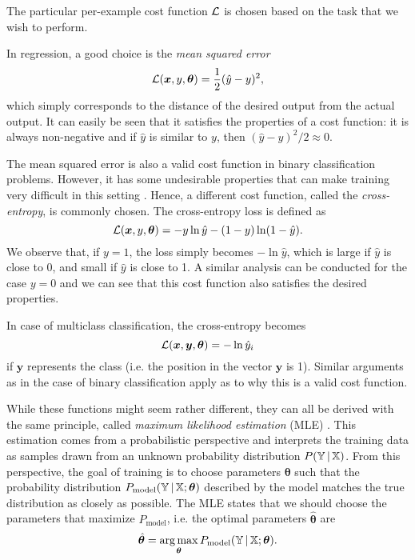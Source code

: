 The particular per-example cost function $\operatorname{\mathcal{L}}$ is chosen based on the task that we wish to perform.

In regression, a good choice is the \emph{mean squared error}
\begin{equation}
\operatorname{\mathcal{L}}(\bm{x}, y, \bm{\theta}) = \frac1{2}(\hat{y}-y)^2,
\end{equation}
which simply corresponds to the distance of the desired output from the actual output. It can easily be seen that it satisfies the properties of a cost function: it is always non-negative and if $\hat{y}$ is similar to $y$, then $(\hat{y}-y)^2/2 \approx 0$.

The mean squared error is also a valid cost function in  binary classification problems. However, it has some undesirable properties that can make training very difficult in this setting \cite[Ch.\,6,\,p.\,178]{DBLP:books/daglib/0040158}. Hence, a different cost function, called the \emph{cross-entropy}, is commonly chosen. The cross-entropy loss is defined as
\begin{equation}
\operatorname{\mathcal{L}}(\bm{x}, y, \bm{\theta}) = -y \ln \hat{y} - (1-y)\ln(1-\hat{y}).
\end{equation}
We observe that, if $y=1$, the loss simply becomes $-\ln\hat{y}$, which is large if $\hat{y}$ is close to 0, and small if $\hat{y}$ is close to 1. A similar analysis can be conducted for the case $y=0$ and we can see that this cost function also satisfies the desired properties.

In case of multiclass classification, the cross-entropy becomes
\begin{equation}
\operatorname{\mathcal{L}}(\bm{x}, \bm{y}, \bm{\theta}) = -\ln \hat{y}_i
\end{equation}
if $\bm{y}$ represents the  class (i.e. the  position in the vector $\bm{y}$ is 1). Similar arguments as in the case of binary classification apply as to why this is a valid cost function.

While these functions might seem rather different, they can all be derived with the same principle, called \emph{maximum likelihood estimation} (MLE) \cite[Ch.\,5,\,pp.\,128-131]{DBLP:books/daglib/0040158}. This estimation comes from a probabilistic perspective and interprets the training data as samples drawn from an unknown probability distribution $P(\mathbb{Y}\,|\,\mathbb{X})$. From this perspective, the goal of training is to choose parameters $\bm{\theta}$ such that the probability distribution $P_{\text{model}}(\mathbb{Y}\,|\,\mathbb{X}; \bm{\theta})$ described by the model matches the true distribution as closely as possible. The MLE states that we should choose the parameters that maximize $P_{\text{model}}$, i.e. the optimal parameters $\hat{\bm{\theta}}$ are
\begin{equation}
\hat{\bm{\theta}} = \operatorname*{arg\,max}_{\bm{\theta}} P_{\text{model}}(\mathbb{Y}\,|\,\mathbb{X}; \bm{\theta}).
\end{equation}

